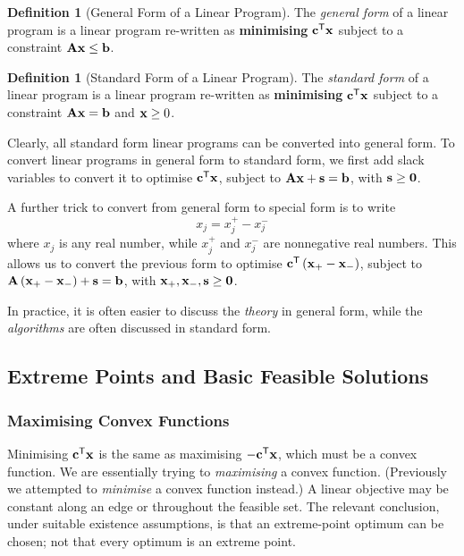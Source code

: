\documentclass[11pt]{article}
\theoremstyle{definition}
\newtheorem{definition}[theorem]{Definition}
\theoremstyle{remark}
\newcommand{\pqty}[1]{\left(#1\right)}
\newcommand{\transpose}{^{\mathsf{T}}}
\begin{document}
\begin{definition}[General Form of a Linear Program]\label{optim-unit-0044}
    The \emph{general form} of a linear program is a linear program re-written as \textbf{minimising} \(\vb{c}\transpose \vb{x}\) subject to a constraint \(\vb{A}\vb{x} \leq \vb{b}\).
\end{definition}

\begin{definition}[Standard Form of a Linear Program]\label{optim-unit-0045}
    The \emph{standard form} of a linear program is a linear program re-written as \textbf{minimising} \(\vb{c}\transpose \vb{x}\) subject to a constraint \(\vb{A}\vb{x} = \vb{b}\) and \(\vb{x} \geq 0\).
\end{definition}

Clearly, all standard form linear programs can be converted into general form. To convert linear programs in general form to standard form, we first add slack variables to convert it to optimise \(\vb{c}\transpose \vb{x}\), subject to \(\vb{A} \vb{x} + \vb{s} = \vb{b}\), with \(\vb{s} \geq \vb{0}\).

A further trick to convert from general form to special form is to write
\[
    x_j = x_j^+ - x_j^-
\]
where \(x_j\) is any real number, while \(x_j^+\) and \(x_j^-\) are nonnegative real numbers. This allows us to convert the previous form to optimise \(\vb{c}\transpose \pqty{\vb{x}_+ - \vb{x}_-}\), subject to \(\vb{A} \pqty{\vb{x}_+ - \vb{x}_-} + \vb{s} = \vb{b}\), with \(\vb{x}_+, \vb{x}_-, \vb{s} \geq \vb{0}\).

In practice, it is often easier to discuss the \emph{theory} in general form, while the \emph{algorithms} are often discussed in standard form.

\subsection{Extreme Points and Basic Feasible Solutions}
\subsubsection{Maximising Convex Functions}

Minimising \(\vb{c}\transpose \vb{x}\) is the same as maximising \(-\vb{c}\transpose \vb{x}\), which must be a convex function. We are essentially trying to \emph{maximising} a convex function. (Previously we attempted to \emph{minimise} a convex function instead.) A linear objective may be constant along an edge or throughout the feasible set. The relevant conclusion, under suitable existence assumptions, is that an extreme-point optimum can be chosen; not that every optimum is an extreme point.
\end{document}
